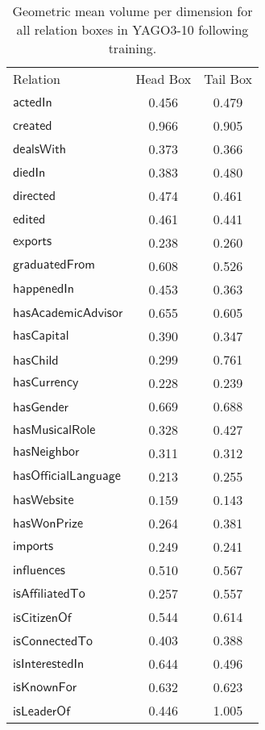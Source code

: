 \documentclass{article}
\begin{document}
\begin{wraptable}[43]{r}{0.45\textwidth}
	\centering
	\caption{Geometric mean volume per dimension for all relation boxes in YAGO3-10 following training.} 
	\label{tab:YAGOVols} 
	\begin{tabular}{l@{\hskip 6pt}c@{\hskip 3pt}c@{\hskip 3pt}}
		\toprule 
		Relation & Head Box & Tail Box\\
		\cmidrule{2-3}
		$\mathsf{actedIn}$ & 0.456 & 0.479\\
		$\mathsf{created}$ & 0.966 & 0.905\\
		$\mathsf{dealsWith}$ & 0.373 & 0.366\\
		$\mathsf{diedIn}$ & 0.383 & 0.480\\
		$\mathsf{directed}$ & 0.474 & 0.461\\
		$\mathsf{edited}$ & 0.461 & 0.441\\
		$\mathsf{exports}$ & 0.238 & 0.260 \\
		$\mathsf{graduatedFrom}$ & 0.608 & 0.526 \\
		$\mathsf{happenedIn}$ & 0.453 & 0.363\\
		$\mathsf{hasAcademicAdvisor}$ & 0.655 & 0.605 \\
		$\mathsf{hasCapital}$ & 0.390 & 0.347\\
		$\mathsf{hasChild}$ & 0.299 & 0.761\\
		$\mathsf{hasCurrency}$ & 0.228 & 0.239\\
		$\mathsf{hasGender}$ & 0.669 & 0.688 \\
		$\mathsf{hasMusicalRole}$ & 0.328 & 0.427 \\
		$\mathsf{hasNeighbor}$ & 0.311 & 0.312\\
		$\mathsf{hasOfficialLanguage}$ & 0.213 & 0.255\\
		$\mathsf{hasWebsite}$ & 0.159 & 0.143 \\
		$\mathsf{hasWonPrize}$ & 0.264 & 0.381\\
		$\mathsf{imports}$ & 0.249 & 0.241 \\
		$\mathsf{influences}$ & 0.510 & 0.567\\
		$\mathsf{isAffiliatedTo}$ & 0.257 & 0.557\\
		$\mathsf{isCitizenOf}$ & 0.544 & 0.614 \\
		$\mathsf{isConnectedTo}$ & 0.403 & 0.388\\
		$\mathsf{isInterestedIn}$ & 0.644 & 0.496\\
		$\mathsf{isKnownFor}$ & 0.632 & 0.623\\
		$\mathsf{isLeaderOf}$ & 0.446 & 1.005\\

\end{tabular}
\end{wraptable}
\end{document}
